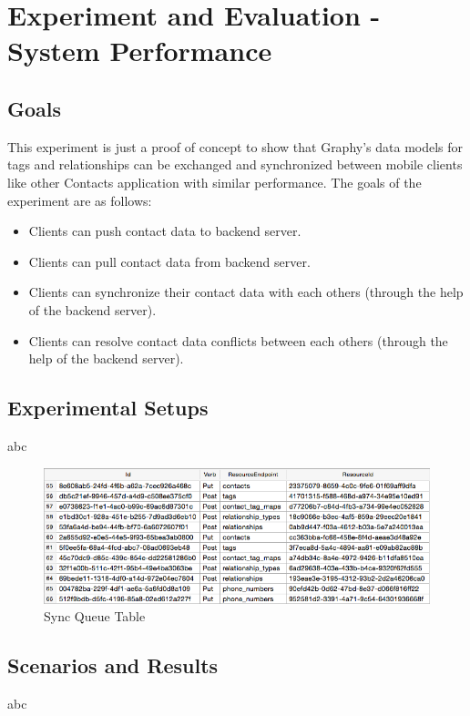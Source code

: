 \chapter{Experiment and Evaluation - System Performance}
\section{Goals}
This experiment is just a proof of concept to show that Graphy's data models for tags and relationships can be exchanged and synchronized between mobile clients like other Contacts application with similar performance. The goals of the experiment are as follows:

\begin{itemize}
    \item Clients can push contact data to backend server.
    \item Clients can pull contact data from backend server.
    \item Clients can synchronize their contact data with each others (through the help of the backend server).
    \item Clients can resolve contact data conflicts between each others (through the help of the backend server).
\end{itemize}

\section{Experimental Setups}
abc

\begin{figure}[!h]
\begin{centering}
\includegraphics[scale=0.63]{pics/sync_queue.png}
\caption{Sync Queue Table}\label{fg:sync_queue}
\end{centering}
\end{figure}

\section{Scenarios and Results}
abc

